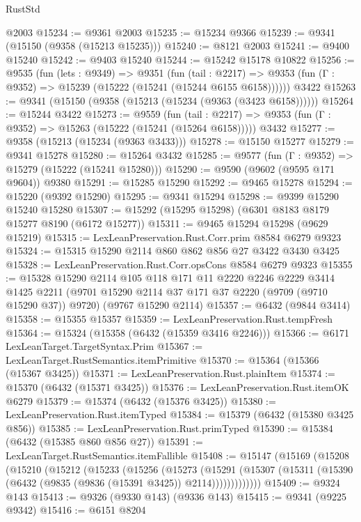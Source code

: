 \begin{lexlean}{RustStd}
\begin{coremodule}
    @2003
@15234 := @9361 @2003
@15235 := @15234 @9366
@15239 := @9341 (@15150 (@9358 (@15213 @15235)))
@15240 := @8121 @2003
@15241 := @9400 @15240
@15242 := @9403 @15240
@15244 := @15242 @15178 @10822
@15256 := @9535
    (fun (lets : @9349) =>
    @9351
      (fun (tail : @2217) =>
      @9353 (fun (Γ : @9352) => @15239 (@15222 (@15241 (@15244 @6155 @6158))))))
    @3422
@15263 := @9341 (@15150 (@9358 (@15213 (@15234 (@9363 (@3423 @6158))))))
@15264 := @15244 @3422
@15273 := @9559
    (fun (tail : @2217) => @9353 (fun (Γ : @9352) => @15263 (@15222 (@15241 (@15264 @6158)))))
    @3432
@15277 := @9358 (@15213 (@15234 (@9363 @3433)))
@15278 := @15150 @15277
@15279 := @9341 @15278
@15280 := @15264 @3432
@15285 := @9577 (fun (Γ : @9352) => @15279 (@15222 (@15241 @15280)))
@15290 := @9590 (@9602 (@9595 @171 @9604)) @9380
@15291 := @15285 @15290
@15292 := @9465 @15278
@15294 := @15220 (@9392 @15290)
@15295 := @9341 @15294
@15298 := @9399 @15290 @15240 @15280
@15307 := @15292 (@15295 @15298) (@6301 @8183 @8179 @15277 @8190 (@6172 @15277))
@15311 := @9465 @15294 @15298 (@9629 @15219)
@15315 := LexLeanPreservation.Rust.Corr.prim @8584 @6279 @9323
@15324 := @15315 @15290 @2114 @860 @862 @856 @27 @3422 @3430 @3425
@15328 := LexLeanPreservation.Rust.Corr.opsCons @8584 @6279 @9323
@15355 := @15328
    @15290
    @2114
    @105
    @118
    @171
    @11
    @2220
    @2246
    @2229
    @3414
    @1425
    @2211
    (@9701 @15290 @2114 @37 @171 @37 @2220 (@9709 (@9710 @15290 @37)) @9720)
    (@9767 @15290 @2114)
@15357 := @6432 (@9844 @3414)
@15358 := @15355 @15357
@15359 := LexLeanPreservation.Rust.tempFresh
@15364 := @15324 (@15358 (@6432 (@15359 @3416 @2246)))
@15366 := @6171 LexLeanTarget.TargetSyntax.Prim
@15367 := LexLeanTarget.RustSemantics.itemPrimitive
@15370 := @15364 (@15366 (@15367 @3425))
@15371 := LexLeanPreservation.Rust.plainItem
@15374 := @15370 (@6432 (@15371 @3425))
@15376 := LexLeanPreservation.Rust.itemOK @6279
@15379 := @15374 (@6432 (@15376 @3425))
@15380 := LexLeanPreservation.Rust.itemTyped
@15384 := @15379 (@6432 (@15380 @3425 @856))
@15385 := LexLeanPreservation.Rust.primTyped
@15390 := @15384 (@6432 (@15385 @860 @856 @27))
@15391 := LexLeanTarget.RustSemantics.itemFallible
@15408 := @15147
    (@15169
      (@15208
        (@15210
          (@15212
            (@15233
              (@15256
                (@15273
                  (@15291
                    (@15307 (@15311 (@15390 (@6432 (@9835 (@9836 (@15391 @3425)) @2114)))))))))))))
@15409 := @9324 @143
@15413 := @9326 (@9330 @143) (@9336 @143)
@15415 := @9341 (@9225 @9342)
@15416 := @6151 @8204

\end{coremodule}
\end{lexlean}
